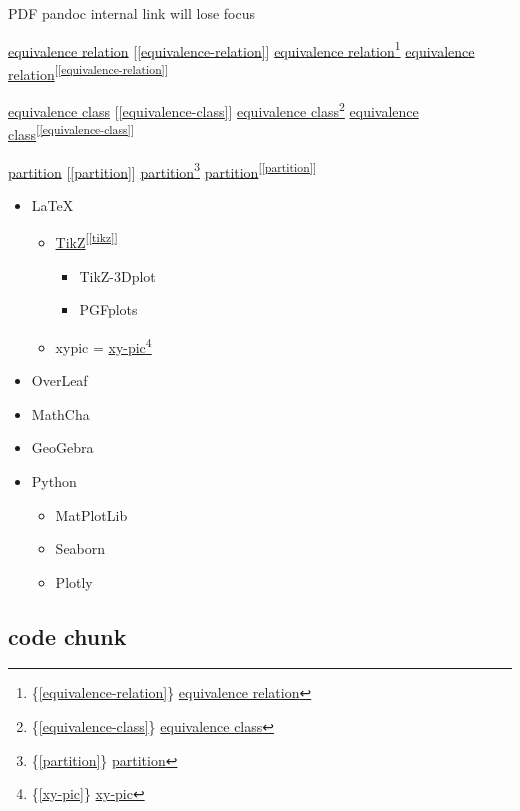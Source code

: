 \documentclass[
]{book}
\providecommand{\tightlist}{%
  \setlength{\itemsep}{0pt}\setlength{\parskip}{0pt}}
\theoremstyle{definition}
\theoremstyle{definition}
\theoremstyle{definition}
\theoremstyle{definition}
\theoremstyle{remark}
\begin{document}
PDF pandoc internal link will lose focus

\hyperref[equivalence-relation]{equivalence relation} {[}\ref{equivalence-relation}{]} \hyperref[equivalence-relation]{equivalence relation}\footnote{\{\ref{equivalence-relation}\} \hyperref[equivalence-relation]{equivalence relation}} \hyperref[equivalence-relation]{equivalence relation}\textsuperscript{{[}\ref{equivalence-relation}{]}}

\hyperref[equivalence-class]{equivalence class} {[}\ref{equivalence-class}{]} \hyperref[equivalence-class]{equivalence class}\footnote{\{\ref{equivalence-class}\} \hyperref[equivalence-class]{equivalence class}} \hyperref[equivalence-class]{equivalence class}\textsuperscript{{[}\ref{equivalence-class}{]}}

\hyperref[partition]{partition} {[}\ref{partition}{]} \hyperref[partition]{partition}\footnote{\{\ref{partition}\} \hyperref[partition]{partition}} \hyperref[partition]{partition}\textsuperscript{{[}\ref{partition}{]}}

\begin{itemize}
\tightlist
\item
  LaTeX

  \begin{itemize}
  \tightlist
  \item
    \hyperref[tikz]{TikZ}\textsuperscript{{[}\ref{tikz}{]}}

    \begin{itemize}
    \tightlist
    \item
      TikZ-3Dplot
    \item
      PGFplots
    \end{itemize}
  \item
    xypic = \hyperref[xy-pic]{xy-pic}\footnote{\{\ref{xy-pic}\} \hyperref[xy-pic]{xy-pic}}
  \end{itemize}
\item
  OverLeaf
\item
  MathCha
\item
  GeoGebra
\item
  Python

  \begin{itemize}
  \tightlist
  \item
    MatPlotLib
  \item
    Seaborn
  \item
    Plotly
  \end{itemize}
\end{itemize}

\subsection{code chunk}\label{code-chunk}
\end{document}
